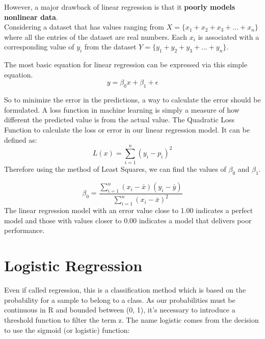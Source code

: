 \documentclass[12pt]{article}
\begin{document}
However, a major drawback of linear regression is that it \textbf{poorly models nonlinear data}.
\\
Considering a dataset that has values ranging from 
$X = \lbrace x_{1}+x_{2}+x_{3}+...+x_{n} \rbrace$ where
all the entries of the dataset are real numbers. Each $x_{i}$ is associated with a corresponding value of $y_{i}$ from the dataset $Y = \lbrace y_{1}+y_{2}+y_{3}+...+y_{n} \rbrace$.

The most basic equation for linear regression can be expressed via this simple equation.
$$y = \beta_{0}x+\beta_{1}+\epsilon$$

So to minimize the error in the predictions, a way to calculate the error should be formulated. A loss function in machine learning is simply a measure of how different the predicted value is from the actual value. The Quadratic Loss Function to calculate the loss or error in our linear regression model. It can be defined as:
$$L(x) = \sum_{i=1}^{n}(y_{i}-p_{i})^{2} $$
Therefore using the method of Least Squares, we can find the values of $\beta_{0}$ and $\beta_{1}$.

$$
\beta_{0} = \frac{\sum_{i=1}^{n} ( x_{i}-\bar{x}) (y_{i}-\bar{y})}{\sum_{i=1}^{n} ( x_{i}-\bar{x})^{2} }
$$
The linear regression model with an error value close to 1.00 indicates a perfect model and those with values closer to 0.00 indicates a model that delivers poor performance.

\newpage
\section{Logistic Regression}
Even if called regression, this is a classification method which is based on the probability for
a sample to belong to a class. As our probabilities must be continuous in R and bounded
between (0, 1), it's necessary to introduce a threshold function to filter the term z. The name
logistic comes from the decision to use the sigmoid (or logistic) function:

\newpage
\end{document}
